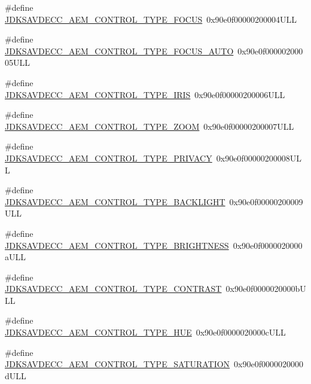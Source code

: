 \begin{DoxyCompactItemize}
\item 
\#define \hyperlink{group__control__type_ga1127fd06f7286823514cf0ca162058a0}{J\+D\+K\+S\+A\+V\+D\+E\+C\+C\+\_\+\+A\+E\+M\+\_\+\+C\+O\+N\+T\+R\+O\+L\+\_\+\+T\+Y\+P\+E\+\_\+\+F\+O\+C\+US}~0x90e0f00000200004\+U\+LL
\item 
\#define \hyperlink{group__control__type_gac78f210f59a235be3a2b75a641052c47}{J\+D\+K\+S\+A\+V\+D\+E\+C\+C\+\_\+\+A\+E\+M\+\_\+\+C\+O\+N\+T\+R\+O\+L\+\_\+\+T\+Y\+P\+E\+\_\+\+F\+O\+C\+U\+S\+\_\+\+A\+U\+TO}~0x90e0f00000200005\+U\+LL
\item 
\#define \hyperlink{group__control__type_ga070489d41999c60ca147dec2c973a422}{J\+D\+K\+S\+A\+V\+D\+E\+C\+C\+\_\+\+A\+E\+M\+\_\+\+C\+O\+N\+T\+R\+O\+L\+\_\+\+T\+Y\+P\+E\+\_\+\+I\+R\+IS}~0x90e0f00000200006\+U\+LL
\item 
\#define \hyperlink{group__control__type_ga44499f3e03a59a3fc50ed7b918be76df}{J\+D\+K\+S\+A\+V\+D\+E\+C\+C\+\_\+\+A\+E\+M\+\_\+\+C\+O\+N\+T\+R\+O\+L\+\_\+\+T\+Y\+P\+E\+\_\+\+Z\+O\+OM}~0x90e0f00000200007\+U\+LL
\item 
\#define \hyperlink{group__control__type_ga847129cec319a6dd515c1c4a3de8c2ef}{J\+D\+K\+S\+A\+V\+D\+E\+C\+C\+\_\+\+A\+E\+M\+\_\+\+C\+O\+N\+T\+R\+O\+L\+\_\+\+T\+Y\+P\+E\+\_\+\+P\+R\+I\+V\+A\+CY}~0x90e0f00000200008\+U\+LL
\item 
\#define \hyperlink{group__control__type_gaee7442cc995745b8bffef674c8eeaf11}{J\+D\+K\+S\+A\+V\+D\+E\+C\+C\+\_\+\+A\+E\+M\+\_\+\+C\+O\+N\+T\+R\+O\+L\+\_\+\+T\+Y\+P\+E\+\_\+\+B\+A\+C\+K\+L\+I\+G\+HT}~0x90e0f00000200009\+U\+LL
\item 
\#define \hyperlink{group__control__type_ga56579865ef3674b314ec9ca4c4d5e493}{J\+D\+K\+S\+A\+V\+D\+E\+C\+C\+\_\+\+A\+E\+M\+\_\+\+C\+O\+N\+T\+R\+O\+L\+\_\+\+T\+Y\+P\+E\+\_\+\+B\+R\+I\+G\+H\+T\+N\+E\+SS}~0x90e0f0000020000a\+U\+LL
\item 
\#define \hyperlink{group__control__type_ga534b55736932c4105b1ba3a424b6168f}{J\+D\+K\+S\+A\+V\+D\+E\+C\+C\+\_\+\+A\+E\+M\+\_\+\+C\+O\+N\+T\+R\+O\+L\+\_\+\+T\+Y\+P\+E\+\_\+\+C\+O\+N\+T\+R\+A\+ST}~0x90e0f0000020000b\+U\+LL
\item 
\#define \hyperlink{group__control__type_ga8f4705ce690695c5d24e50c1a05f563c}{J\+D\+K\+S\+A\+V\+D\+E\+C\+C\+\_\+\+A\+E\+M\+\_\+\+C\+O\+N\+T\+R\+O\+L\+\_\+\+T\+Y\+P\+E\+\_\+\+H\+UE}~0x90e0f0000020000c\+U\+LL
\item 
\#define \hyperlink{group__control__type_ga6ab34011f737a244c852f54f0da9e842}{J\+D\+K\+S\+A\+V\+D\+E\+C\+C\+\_\+\+A\+E\+M\+\_\+\+C\+O\+N\+T\+R\+O\+L\+\_\+\+T\+Y\+P\+E\+\_\+\+S\+A\+T\+U\+R\+A\+T\+I\+ON}~0x90e0f0000020000d\+U\+LL

\end{DoxyCompactItemize}
